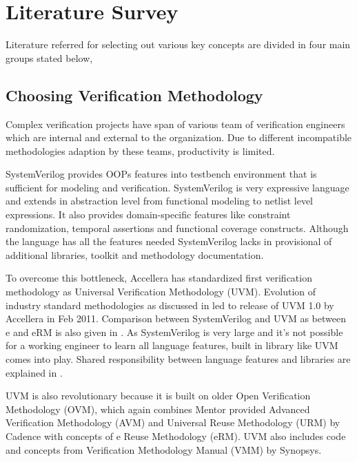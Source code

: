 \chapter{Literature Survey}

Literature referred for selecting out various key concepts are divided in four main groups stated below,


\section{Choosing Verification Methodology}

Complex verification projects have span of various team of verification engineers which are internal and external to the organization. Due to different incompatible methodologies adaption by these teams, productivity is limited. \par

SystemVerilog provides OOPs features into testbench environment that is sufficient for modeling and verification. SystemVerilog is very expressive language and extends in abstraction level from functional modeling to netlist level expressions. It also provides domain-specific features like constraint randomization, temporal assertions and functional coverage constructs. Although the language has all the features needed SystemVerilog lacks in provisional of additional libraries, toolkit and methodology documentation. \par

To overcome this bottleneck, Accellera has standardized first verification methodology as Universal Verification Methodology (UVM). Evolution of industry standard methodologies as discussed in \cite{svuvm} led to release of UVM 1.0 by Accellera in Feb 2011. Comparison between SystemVerilog and UVM as between e and eRM is also given in \cite{svuvm}. As SystemVerilog is very large and it’s not possible for a working engineer to learn all language features, built in library like UVM comes into play. Shared responsibility between language features and libraries are explained in \cite{svuvm}. \par

UVM is also revolutionary because it is built on older Open Verification Methodology (OVM), which again combines Mentor provided Advanced Verification Methodology (AVM) and Universal Reuse Methodology (URM) by Cadence with concepts of e Reuse Methodology (eRM). UVM also includes code and concepts from Verification Methodology Manual (VMM) by Synopsys. 

